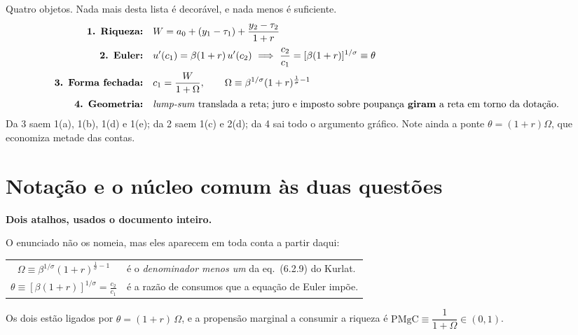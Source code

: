 \documentclass[11pt, a4paper]{article}
\newcommand{\passo}[1]{\medskip\noindent\textbf{#1}\par\nobreak}
\begin{document}
\begin{tcolorbox}[planbox, title={O que você precisa saber de cor ao entrar na prova}]
\small
Quatro objetos. Nada mais desta lista é decorável, e nada menos é suficiente.
\begin{align*}
\text{\textbf{1. Riqueza:}}\quad & W = a_0 + (y_1-\tau_1) + \frac{y_2-\tau_2}{1+r} \\[2pt]
\text{\textbf{2. Euler:}}\quad & u'(c_1) = \beta(1+r)\,u'(c_2)
  \ \Longrightarrow\ \frac{c_2}{c_1} = [\beta(1+r)]^{1/\sigma} \equiv \theta \\[2pt]
\text{\textbf{3. Forma fechada:}}\quad & c_1 = \frac{W}{1+\Omega},
  \qquad \Omega \equiv \beta^{1/\sigma}(1+r)^{\frac{1}{\sigma}-1} \\[2pt]
\text{\textbf{4. Geometria:}}\quad & \text{\emph{lump-sum} translada a reta;
  juro e imposto sobre poupança \textbf{giram} a reta em torno da dotação.}
\end{align*}
Da 3 saem 1(a), 1(b), 1(d) e 1(e); da 2 saem 1(c) e 2(d); da 4 sai todo o argumento
gráfico. Note ainda a ponte $\theta=(1+r)\Omega$, que economiza metade das contas.
\end{tcolorbox}
\label{sec:fimplano}

\section[Notação e o núcleo comum]{Notação e o núcleo comum às duas questões}
\label{sec:notacao}

\passo{Dois atalhos, usados o documento inteiro.}
O enunciado não os nomeia, mas eles aparecem em toda conta a partir daqui:

\begin{center}
\begin{tabular}{@{}cl@{}}
\toprule
$\displaystyle \Omega \equiv \beta^{1/\sigma}(1+r)^{\frac{1}{\sigma}-1}$
  & é o \emph{denominador menos um} da eq.\ (6.2.9) do Kurlat. \\[6pt]
$\displaystyle \theta \equiv [\beta(1+r)]^{1/\sigma} = \frac{c_2}{c_1}$
  & é a razão de consumos que a equação de Euler impõe. \\
\bottomrule
\end{tabular}
\end{center}

Os dois estão ligados por $\theta = (1+r)\,\Omega$, e a propensão marginal a consumir a
riqueza é $\mathrm{PMgC} \equiv \dfrac{1}{1+\Omega} \in (0,1)$.
\end{document}
